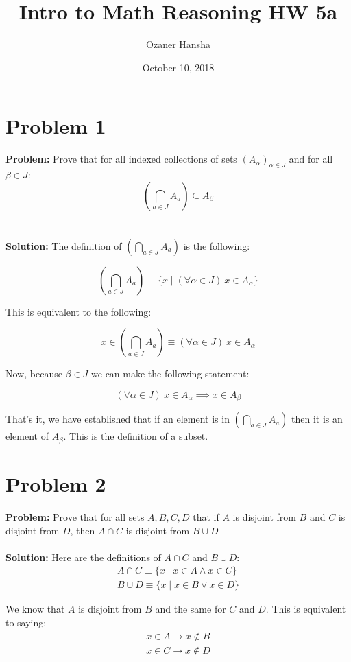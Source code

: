 \documentclass{article}
\begin{document}
\title{Intro to Math Reasoning HW 5a}
\author{Ozaner Hansha}
\date{October 10, 2018}
\maketitle

\section*{Problem 1}
\textbf{Problem:} Prove that for all indexed collections of sets $(A_\alpha)_{\alpha\in J}$ and for all $\beta\in J$:
$$\left(\bigcap_{a\in J}A_a\right)\subseteq A_\beta$$
\\\\
\textbf{Solution:} The definition of $\left(\bigcap_{a\in J}A_a\right)$ is the following:

$$\left(\bigcap_{a\in J}A_a\right)\equiv\{x\mid(\forall\alpha\in J)\ x\in A_\alpha\}$$

This is equivalent to the following:

$$x\in\left(\bigcap_{a\in J}A_a\right)\equiv (\forall\alpha\in J)\ x\in A_\alpha$$

Now, because $\beta\in J$ we can make the following statement:

$$(\forall\alpha\in J)\ x\in A_\alpha\implies x\in A_\beta$$

That's it, we have established that if an element is in $\left(\bigcap_{a\in J}A_a\right)$ then it is an element of $A_\beta$. This is the definition of a subset.

\section*{Problem 2}
\textbf{Problem:} Prove that for all sets $A,B,C,D$ that if $A$ is disjoint from $B$ and $C$ is disjoint from $D$, then $A\cap C$ is disjoint from $B\cup D$
\\\\
\textbf{Solution:} Here are the definitions of $A\cap C$ and $B\cup D$:
\begin{align*}
  A\cap C\equiv\{x\mid x\in A\wedge x\in C\}\\
  B\cup D\equiv\{x\mid x\in B\vee x\in D\}
\end{align*}

We know that $A$ is disjoint from $B$ and the same for $C$ and $D$. This is equivalent to saying:
\begin{align*}
  x\in A\rightarrow x\not\in B\\
  x\in C\rightarrow x\not\in D
\end{align*}
\end{document}
